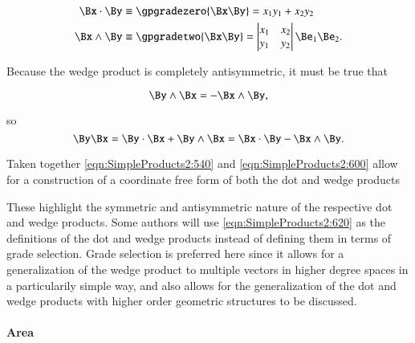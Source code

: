 \begin{dmath}\label{eqn:SimpleProducts2:560}
\begin{aligned}
\Bx \cdot \By &\equiv \gpgradezero{\Bx\By} = x_1 y_1 + x_2 y_2 \\
\Bx \wedge \By &\equiv \gpgradetwo{\Bx\By} =
\begin{vmatrix}
   x_1 & x_2 \\
   y_1 & y_2
\end{vmatrix}
   \Be_1 \Be_2. \\
\end{aligned}
\end{dmath}

Because the wedge product is completely antisymmetric, it must be true that

\begin{dmath}\label{eqn:SimpleProducts2:580}
\By \wedge \Bx = -\Bx \wedge \By,
\end{dmath}

so
\begin{dmath}\label{eqn:SimpleProducts2:600}
\By \Bx
= \By \cdot \Bx + \By \wedge \Bx
= \Bx \cdot \By - \Bx \wedge \By.
\end{dmath}

Taken together \cref{eqn:SimpleProducts2:540} and \cref{eqn:SimpleProducts2:600} allow for a construction of a coordinate free form of both the dot and wedge products


These highlight the symmetric and antisymmetric nature of the respective dot and wedge products.
Some authors will use \cref{eqn:SimpleProducts2:620} as the definitions of the dot and wedge products instead of defining them in terms of grade selection.
Grade selection is preferred here since it allows for a generalization of the wedge product to multiple vectors in higher degree spaces in a particularily simple way, and also allows for the generalization of the dot and wedge products with higher order geometric structures to be discussed.

\paragraph{Area}

